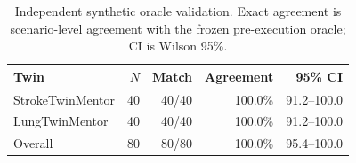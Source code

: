 \begin{table}[t]
\caption{Independent synthetic oracle validation. Exact agreement is scenario-level agreement with the frozen pre-execution oracle; CI is Wilson 95\%.}
\label{tab:cross_implementation}
\centering
\footnotesize
\begin{tabular}{lrrrr}
\hline
Twin & $N$ & Match & Agreement & 95\% CI \\
\hline
StrokeTwinMentor & 40 & 40/40 & 100.0\% & 91.2--100.0 \\
LungTwinMentor & 40 & 40/40 & 100.0\% & 91.2--100.0 \\
Overall & 80 & 80/80 & 100.0\% & 95.4--100.0 \\
\hline
\end{tabular}
\end{table}
